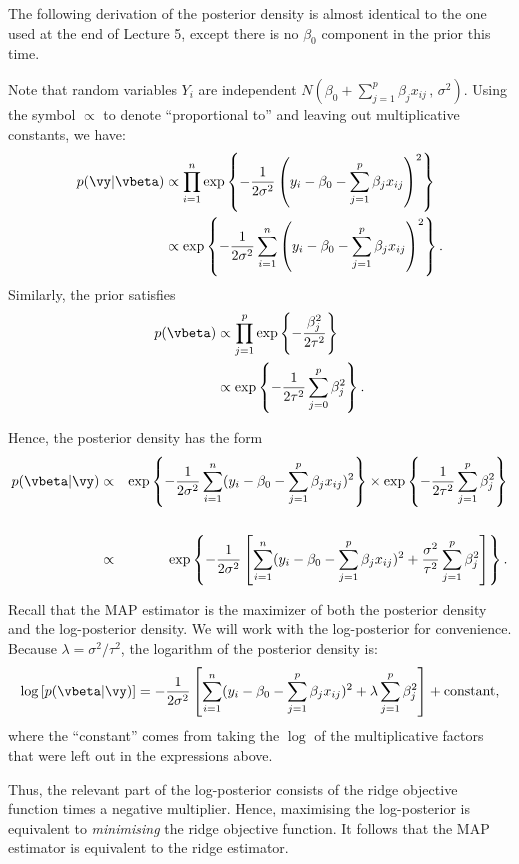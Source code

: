 \documentclass[12pt, answers]{exam}
\def\({\left(}
\def\){\right)}
\begin{document}
\begin{questions}
\bigskip

\begin{solution}

The following derivation of the posterior density is almost identical to the one used at the end of Lecture 5, except there is no $\beta_0$ component in the prior this time.

Note that random variables $Y_i$ are independent $N\(\beta_0+\sum_{j=1}^{p}\beta_jx_{ij}\,,\,\sigma^2\)$.  Using the symbol $\propto$ to denote ``proportional to'' and leaving out multiplicative constants, we have:
\begin{align*}
p(\vy |\vbeta) & \propto \prod_{i=1}^n\exp\left\{-\frac{1}{2\sigma^2}\(y_i-\beta_0-\sum_{j=1}^{p}\beta_jx_{ij}\)^2\right\}\\
&\propto \exp\left\{-\frac{1}{2\sigma^2}\sum_{i=1}^n\(y_i-\beta_0-\sum_{j=1}^{p}\beta_jx_{ij}\)^2\right\}.
\end{align*}
Similarly, the prior satisfies
\begin{align*}
p(\vbeta)& \propto \prod_{j=1}^p\exp\left\{-\frac{\beta_j^2}{2\tau^2}\right\}\\
& \propto \exp\left\{-\frac{1}{2\tau^2}\sum_{j=0}^{p}\beta_j^2\right\}.
\end{align*}

Hence, the posterior density has the form
\begin{eqnarray*}
p(\vbeta|\vy) & \propto & \exp\left\{-\frac{1}{2\sigma^2}\sum_{i=1}^n(y_i-\beta_0-\sum_{j=1}^{p}\beta_jx_{ij})^2\right\}\times \exp\left\{-\frac{1}{2\tau^2}\sum_{j=1}^{p}\beta_j^2\right\}\\
&&\\
&\propto& \exp\left\{-\frac{1}{2\sigma^2}\left[\sum_{i=1}^n(y_i-\beta_0-\sum_{j=1}^{p}\beta_jx_{ij})^2+\frac{\sigma^2}{\tau^2}\sum_{j=1}^{p}\beta_j^2\right]\right\}.
\end{eqnarray*}

Recall that the MAP estimator is the maximizer of both the posterior density and the log-posterior density.  We will work with the log-posterior for convenience.  Because $\lambda=\sigma^2/\tau^2$, the logarithm of the posterior density is:
\begin{equation*}
\log\left[ p(\vbeta|\vy)\right]=-\frac{1}{2\sigma^2}\left[\sum_{i=1}^n(y_i-\beta_0-\sum_{j=1}^{p}\beta_jx_{ij})^2+\lambda\sum_{j=1}^{p}\beta_j^2\right]+\text{constant},
\end{equation*}
where the ``constant'' comes from taking the $\log$ of the multiplicative factors that were left out in the expressions above.

Thus, the relevant part of the log-posterior consists of the ridge objective function times a negative multiplier. Hence, maximising the log-posterior is equivalent to \textit{minimising} the ridge objective function.  It follows that the MAP estimator is equivalent to the ridge estimator.

\end{solution}

\end{questions}
\end{document}
